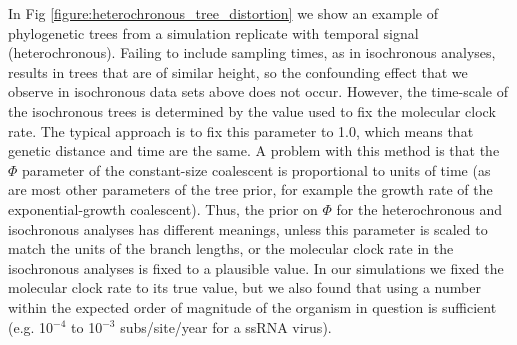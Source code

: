 \documentclass[10pt,letterpaper]{article}
\begin{document}
In Fig \ref{figure:heterochronous_tree_distortion} we show an example of phylogenetic trees from a simulation replicate with temporal signal (heterochronous). Failing to include sampling times, as in isochronous analyses, results in trees that are of similar height, so the confounding effect that we observe in isochronous data sets above does not occur. However, the time-scale of the isochronous trees is determined by the value used to fix the molecular clock rate. The typical approach is to fix this parameter to 1.0, which means that genetic distance and time are the same. A problem with this method is that the $\Phi$ parameter of the constant-size coalescent is proportional to units of time \cite{ho2011skyline, drummond2002estimating} (as are most other parameters of the tree prior, for example the growth rate of the exponential-growth coalescent). Thus, the prior on $\Phi$ for the heterochronous and isochronous analyses has different meanings, unless this parameter is scaled to match the units of the branch lengths, or the molecular clock rate in the isochronous analyses is fixed to a plausible value. In our simulations we fixed the molecular clock rate to its true value, but we also found that using a number within the expected order of magnitude of the organism in question is sufficient (e.g. 10$^{-4}$ to 10$^{-3}$ subs/site/year for a ssRNA virus).
\end{document}
